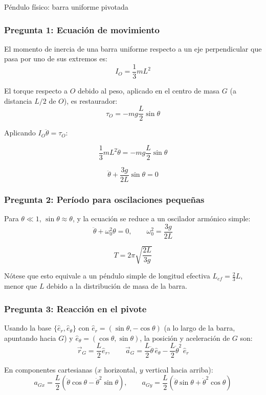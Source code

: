 \begin{solucion}{Péndulo físico: barra uniforme pivotada}
\subsubsection*{Pregunta 1: Ecuación de movimiento}

El momento de inercia de una barra uniforme respecto a un eje perpendicular que pasa por uno de sus extremos es:
$$I_O = \frac{1}{3}mL^2$$

El torque respecto a $O$ debido al peso, aplicado en el centro de masa $G$ (a distancia $L/2$ de $O$), es restaurador:
$$\tau_O = -mg\frac{L}{2}\sin\theta$$

Aplicando $I_O\ddot{\theta} = \tau_O$:

$$\frac{1}{3}mL^2\ddot{\theta} = -mg\frac{L}{2}\sin\theta$$

$$\boxed{\ddot{\theta} + \frac{3g}{2L}\sin\theta = 0}$$

\subsubsection*{Pregunta 2: Período para oscilaciones pequeñas}

Para $\theta \ll 1$, $\sin\theta \approx \theta$, y la ecuación se reduce a un oscilador armónico simple:
$$\ddot{\theta} + \omega_0^2\theta = 0, \qquad \omega_0^2 = \frac{3g}{2L}$$

$$\boxed{T = 2\pi\sqrt{\frac{2L}{3g}}}$$

Nótese que esto equivale a un péndulo simple de longitud efectiva $L_{ef} = \frac{2}{3}L$, menor que $L$ debido a la distribución de masa de la barra.

\subsubsection*{Pregunta 3: Reacción en el pivote}

Usando la base $\{\hat{e}_r, \hat{e}_\theta\}$ con $\hat{e}_r = (\sin\theta, -\cos\theta)$ (a lo largo de la barra, apuntando hacia $G$) y $\hat{e}_\theta = (\cos\theta, \sin\theta)$, la posición y aceleración de $G$ son:
$$\vec{r}_G = \frac{L}{2}\hat{e}_r, \qquad \vec{a}_G = \frac{L}{2}\ddot{\theta}\,\hat{e}_\theta - \frac{L}{2}\dot{\theta}^2\,\hat{e}_r$$

En componentes cartesianas ($x$ horizontal, $y$ vertical hacia arriba):
$$a_{Gx} = \frac{L}{2}\left(\ddot{\theta}\cos\theta - \dot{\theta}^2\sin\theta\right), \qquad a_{Gy} = \frac{L}{2}\left(\ddot{\theta}\sin\theta + \dot{\theta}^2\cos\theta\right)$$


\end{solucion}
